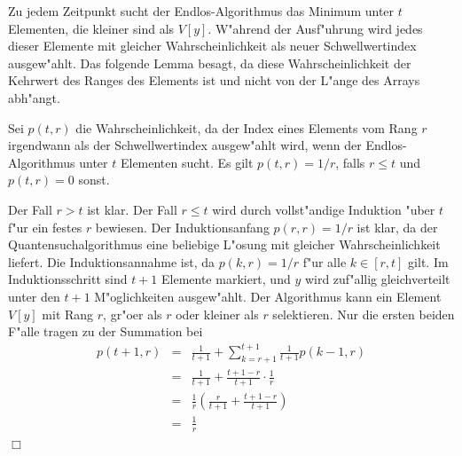          Zu jedem Zeitpunkt sucht der Endlos-Algorithmus das Minimum unter $t$ Elementen, die kleiner sind als $V[y]$. W"ahrend der Ausf"uhrung wird jedes dieser Elemente mit
         gleicher Wahrscheinlichkeit als neuer Schwellwertindex ausgew"ahlt. Das folgende Lemma besagt, da\3 diese Wahrscheinlichkeit der Kehrwert des Ranges des
         Elements ist und nicht von der L"ange des Arrays abh"angt.
         \begin{lemma} Sei $p(t,r)$ die Wahrscheinlichkeit, da\3 der Index eines Elements vom Rang $r$ irgendwann als der Schwellwertindex ausgew"ahlt wird, wenn der
            Endlos-Algorithmus unter $t$ Elementen sucht. Es gilt $p(t,r)=1/r$, falls $r\le t$ und $p(t,r)=0$ sonst.
         \end{lemma}
         \beweis Der Fall $r>t$ ist klar. Der Fall $r\le t$ wird durch vollst"andige Induktion "uber $t$ f"ur ein festes $r$ bewiesen. Der Induktionsanfang $p(r,r)=1/r$ ist
           klar, da der Quantensuchalgorithmus eine beliebige L"osung mit gleicher Wahrscheinlichkeit liefert. Die Induktionsannahme ist, da\3 $p(k,r)=1/r$ f"ur alle $k\in [r,t]$
           gilt. Im Induktionsschritt sind $t+1$ Elemente markiert, und $y$ wird zuf"allig gleichverteilt unter den $t+1$ M"oglichkeiten ausgew"ahlt. Der Algorithmus kann
           ein Element $V[y]$ mit Rang $r$, gr"o\3er als $r$ oder kleiner als $r$ selektieren. Nur die ersten beiden F"alle tragen zu der Summation bei
           \begin{eqnarray*}
              p(t+1,r) & = & \frac{1}{t+1} + \sum_{k=r+1}^{t+1}\frac{1}{t+1} p(k-1,r) \\
                       & = & \frac{1}{t+1} + \frac{t+1-r}{t+1} \cdot \frac{1}{r} \\
                       & = & \frac{1}{r}\left( \frac{r}{t+1} + \frac{t+1-r}{t+1}\right) \\
                       & = & \frac{1}{r}
           \end{eqnarray*}
           \hfill $\Box$

